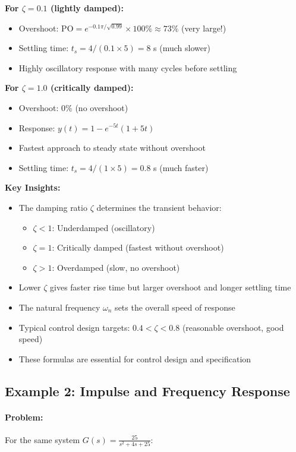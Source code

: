 \documentclass[11pt,a4paper]{article}
\begin{document}
\textbf{For $\zeta = 0.1$ (lightly damped):}
\begin{itemize}
  \item Overshoot: $\text{PO} = e^{-0.1\pi/\sqrt{0.99}} \times 100\% \approx 73\%$ (very large!)
  \item Settling time: $t_s = 4/(0.1 \times 5) = 8$ s (much slower)
  \item Highly oscillatory response with many cycles before settling
\end{itemize}

\textbf{For $\zeta = 1.0$ (critically damped):}
\begin{itemize}
  \item Overshoot: 0\% (no overshoot)
  \item Response: $y(t) = 1 - e^{-5t}(1 + 5t)$
  \item Fastest approach to steady state without overshoot
  \item Settling time: $t_s = 4/(1 \times 5) = 0.8$ s (much faster)
\end{itemize}

\textbf{Key Insights:}
\begin{itemize}
  \item The damping ratio $\zeta$ determines the transient behavior:
    \begin{itemize}
      \item $\zeta < 1$: Underdamped (oscillatory)
      \item $\zeta = 1$: Critically damped (fastest without overshoot)
      \item $\zeta > 1$: Overdamped (slow, no overshoot)
    \end{itemize}
  \item Lower $\zeta$ gives faster rise time but larger overshoot and longer settling time
  \item The natural frequency $\omega_n$ sets the overall speed of response
  \item Typical control design targets: $0.4 < \zeta < 0.8$ (reasonable overshoot, good speed)
  \item These formulas are essential for control design and specification
\end{itemize}

\subsection{Example 2: Impulse and Frequency Response}

\paragraph{Problem:} For the same system $G(s) = \frac{25}{s^2 + 4s + 25}$:
\end{document}
